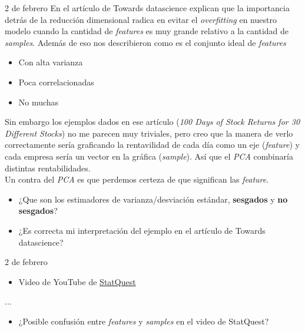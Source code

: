 \begin{entry}{2 de febrero}
En el artículo de Towards datascience explican que la importancia detrás de la reducción dimensional radica en evitar el \textit{overfitting} en nuestro modelo cuando la cantidad de \textit{features} es muy grande relativo a la cantidad de \textit{samples}. Además de eso nos describieron como es el conjunto ideal de \textit{features}
\begin{itemize}
    \item Con alta varianza
    \item Poca correlacionadas
    \item No muchas
\end{itemize}
Sin embargo los ejemplos dados en ese artículo (\textit{100 Days of Stock Returns for 30 Different Stocks}) no me parecen muy triviales, pero creo que la manera de verlo correctamente sería graficando la rentavilidad de cada día como un eje (\textit{feature}) y cada empresa sería un vector en la gráfica (\textit{sample}). Así que el \textit{PCA} combinaría distintas rentabilidades.\\

Un contra del \textit{PCA} es que perdemos certeza de que significan las \textit{feature}.
\tcbsubtitle{\LBltodo}\vspace{-1.25em}
\begin{itemize}
    \item ¿Que son los estimadores de varianza/desviación estándar, \textbf{sesgados} y \textbf{no sesgados}?
    
    \item ¿Es correcta mi interpretación del ejemplo en el artículo de Towards datascience?
    \end{itemize}
\end{entry}

\begin{entry}{2 de febrero}
\tcbsubtitle{\LBlimportant}
\begin{itemize}
    \item Video de YouTube de \href{https://www.youtube.com/watch?v=HMOI_lkzW08}{StatQuest}
\end{itemize}
\tcblower
\tcbsubtitle{\LBlsummary}
...
\vspace{0.4em}
\tcbsubtitle{\LBltodo}
\begin{itemize}
    \item ¿Posible confusión entre \textit{features} y \textit{samples} en el video de StatQuest?
\end{itemize}
\end{entry}

